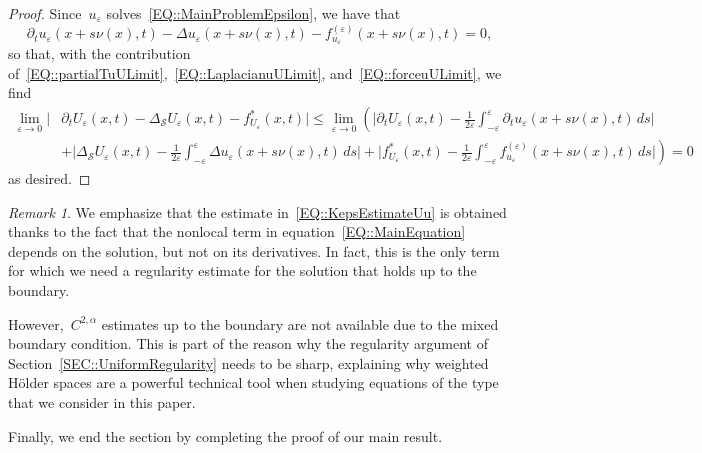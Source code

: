 \documentclass[12pt,a4paper]{amsart}
\numberwithin{equation}{section}
\theoremstyle{definition}
\theoremstyle{remark}
\newtheorem{remark}[theorem]{Remark}
\newcommand{\eps}{\varepsilon}
\renewcommand{\leq}{\leqslant}
\begin{document}
\begin{proof}
    Since~$u_\eps$ solves~\eqref{EQ::MainProblemEpsilon}, we have that
    \begin{equation}
        \partial_t u_\eps(x+s\nu(x),t) - \Delta u_\eps(x+s\nu(x),t) - f_{u_\eps}^{(\eps)}(x+s\nu(x),t) = 0,
    \end{equation}
    so that, with the contribution of~\eqref{EQ::partialTuULimit},~\eqref{EQ::LaplacianuULimit}, and~\eqref{EQ::forceuULimit}, we find
    \begin{align}
        \lim_{\eps \to 0} \bigg|&\partial_t U_\eps(x,t) - \Delta_{\mathcal{S}}U_\eps(x,t) - f^\ast_{U_\eps}(x,t)\bigg| \leq \lim_{\eps \to 0} \left(\bigg|\partial_t U_\eps(x,t) - \frac{1}{2\eps}\int_{-\eps}^\eps \partial_t u_\eps(x+s\nu(x),t)\,ds\bigg|\right.\\
            &\left.+ \bigg|\Delta_{\mathcal{S}}U_\eps(x,t) - \frac{1}{2\eps}\int_{-\eps}^\eps \Delta u_\eps(x + s\nu(x),t)\,ds\bigg|+ \bigg|f_{U_\eps}^\ast(x,t) - \frac{1}{2\eps}\int_{-\eps}^\eps f_{u_\eps}^{(\eps)}(x+s\nu(x),t)\,ds \bigg|\right) = 0
    \end{align}
    as desired.
\end{proof}

\begin{remark}\label{REM::NonlocalitySemilinearForLimit}
    We emphasize that the estimate in~\eqref{EQ::KepsEstimateUu} is obtained thanks to the fact that the nonlocal term in equation~\eqref{EQ::MainEquation} depends on the solution, but not on its derivatives. In fact, this is the only term for which we need a regularity estimate for the solution that holds up to the boundary.
    
    However,~$C^{2,\alpha}$ estimates up to the boundary are not available due to the mixed boundary condition. This is part of the reason why the regularity argument of Section~\ref{SEC::UniformRegularity} needs to be sharp, explaining why weighted Hölder spaces are a powerful technical tool when studying equations of the type that we consider in this paper.
\end{remark}

Finally, we end the section by completing the proof of our main result.
\end{document}

